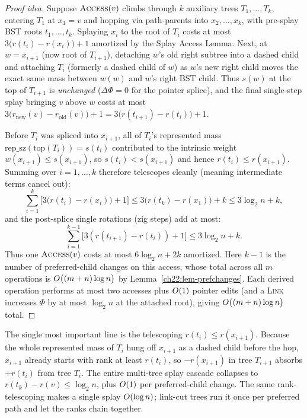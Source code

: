 \begin{proof}[Proof idea]
Suppose $\textsc{Access}(v)$ climbs through $k$ auxiliary trees $T_1,\dots,T_k$,
entering $T_1$ at $x_1=v$ and hopping via path-parents into $x_2,\dots,x_k$, with
pre-splay BST roots $t_1,\dots,t_k$. Splaying $x_i$ to the root of $T_i$ costs at
most $3\bigl(r(t_i)-r(x_i)\bigr)+1$ amortized by the Splay Access Lemma. Next, at $w=x_{i+1}$ (now root of $T_{i+1}$), detaching $w$'s old right subtree
into a dashed child and attaching $T_i$ (formerly a dashed child of $w$) as $w$'s
new right child moves the exact same mass between $w(w)$ and $w$'s right BST
child. Thus $s(w)$ at the top of $T_{i+1}$ is \emph{unchanged} ($\Delta\Phi=0$
for the pointer splice), and the final single-step splay bringing $v$ above $w$
costs at most
$3\bigl(r_{\mathrm{new}}(v)-r_{\mathrm{old}}(v)\bigr)+1=3\bigl(r(t_{i+1})-r(t_i)\bigr)+1$.

Before $T_i$ was spliced into $x_{i+1}$, all of $T_i$'s represented
mass $\text{rep\_sz}(\text{top}(T_i))=s(t_i)$ contributed to the intrinsic
weight $w(x_{i+1})\le s(x_{i+1})$, so $s(t_i) < s(x_{i+1})$ and hence
$r(t_i) \le r(x_{i+1})$. Summing over $i=1,\dots,k$ therefore telescopes cleanly (meaning intermediate terms cancel out):
\[
  \sum_{i=1}^{k} \bigl[3\bigl(r(t_i)-r(x_i)\bigr)+1\bigr]
  \le 3\bigl(r(t_k)-r(x_1)\bigr) + k
  \le 3\log_2 n + k,
\]
and the post-splice single rotations (zig steps) add at most:
\[
  \sum_{i=1}^{k-1}\bigl[3(r(t_{i+1})-r(t_i))+1\bigr] \le 3\log_2 n + k.
\]
Thus one $\textsc{Access}(v)$ costs at most $6\log_2 n + 2k$
amortized. Here $k-1$ is the number of preferred-child changes on this access,
whose total across all $m$ operations is $O\bigl((m+n)\log n\bigr)$ by
Lemma~\ref{ch22:lem-prefchanges}. Each derived operation performs at most two
accesses plus $O(1)$ pointer edits (and a \textsc{Link} increases $\Phi$ by at
most $\log_2 n$ at the attached root), giving $O\bigl((m+n)\log n\bigr)$ total.
\end{proof}

\begin{whybox}
The single most important line is the telescoping $r(t_i)\le r(x_{i+1})$. Because
the whole represented mass of $T_i$ hung off $x_{i+1}$ as a dashed child before the
hop, $x_{i+1}$ already starts with rank at least $r(t_i)$, so $-r(x_{i+1})$ in tree
$T_{i+1}$ absorbs $+r(t_i)$ from tree $T_i$. The entire multi-tree splay cascade
collapses to $r(t_k)-r(v)\le \log_2 n$, plus $O(1)$ per preferred-child change.
The same rank-telescoping makes a single splay
$O(\log n)$; link-cut trees run it once per preferred path and let the
ranks chain together.
\end{whybox}

